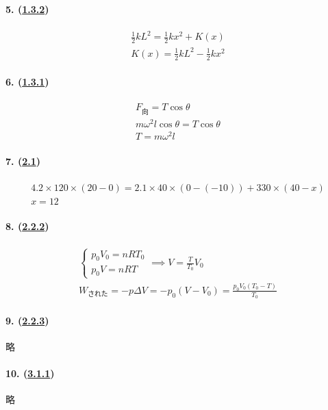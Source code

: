 \paragraph{5. (\hyperref[subsec:1.3.2]{1.3.2})}

\begin{gather*}
    \frac12kL^2=\frac12kx^2+K(x)\\
    K(x)=\frac12kL^2-\frac12kx^2
\end{gather*}

\paragraph{6. (\hyperref[subsec:1.3.1]{1.3.1})}

\begin{gather*}
    F_\textrm{向}=T\cos\theta\\
    m\omega^2l\cos\theta=T\cos\theta\\
    T=m\omega^2l
\end{gather*}

\paragraph{7. (\hyperref[sec:2.1]{2.1})}

\begin{gather*}
    4.2\times120\times(20-0)=2.1\times40\times(0-(-10))+330\times(40-x)\\
    x=12
\end{gather*}

\paragraph{8. (\hyperref[subsec:2.2.2]{2.2.2})}

\begin{gather*}
    \begin{cases}
        p_0V_0=nRT_0\\
        p_0V=nRT
    \end{cases}\implies V=\frac{T}{T_0}V_0\\
    W_\textrm{された}=-p\Delta V=-p_0(V-V_0)=\frac{p_0V_0(T_0-T)}{T_0}
\end{gather*}

\paragraph{9. (\hyperref[subsec:2.2.3]{2.2.3})} 略
\paragraph{10. (\hyperref[subsec:3.1.1]{3.1.1})} 略
